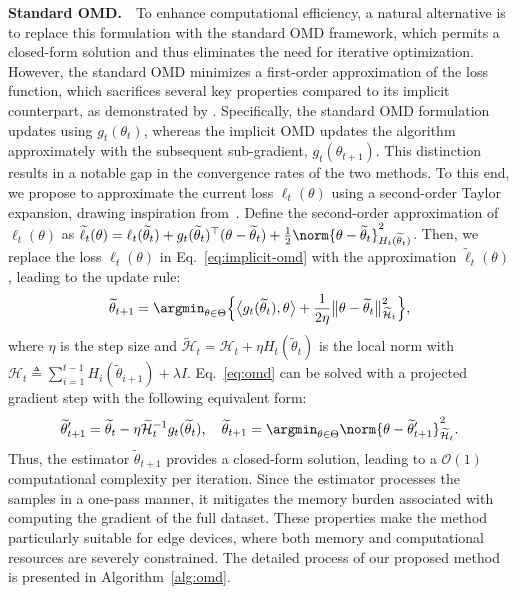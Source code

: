 \textbf{Standard OMD.}~~To enhance computational efficiency, a natural alternative is to replace this formulation with the standard OMD framework, which permits a closed-form solution and thus eliminates the need for iterative optimization. However, the standard OMD minimizes a first-order approximation of the loss function, which sacrifices several key properties compared to its implicit counterpart, as demonstrated by \citet{NeurIPS'20:Campolongo-IOMD}. Specifically, the standard OMD formulation updates using $g_t(\theta_t)$, whereas the implicit OMD updates the algorithm approximately with the subsequent sub-gradient, $g_t(\theta_{t+1})$. This distinction results in a notable gap in the convergence rates of the two methods. To this end, we propose to approximate the current loss $\ell_t(\theta)$ using a second-order Taylor expansion, drawing inspiration from~\citet{NeurIPS'23:MLogB}. Define the second-order approximation of $\ell_t(\theta)$ as $\widetilde{\ell}_t(\theta) = \ell_t(\widetilde{\theta}_t) + g_t(\widetilde{\theta}_t)^\top (\theta - \widetilde{\theta}_t) + \frac{1}{2} \norm{\theta - \widetilde{\theta}_t}_{H_t(\widetilde{\theta}_t)}^2$. Then, we replace the loss $\ell_t(\theta)$ in Eq.~\eqref{eq:implicit-omd} with the approximation $\widetilde{\ell}_t(\theta)$, leading to the update rule:
\begin{align}
  \label{eq:omd}
  \widetilde{\theta}_{t+1}=\argmin_{\theta \in \Theta} \Big\{\big\langle g_t(\widetilde{\theta}_t), \theta \big\rangle +\frac{1}{2 \eta}\big\|\theta-\widetilde{\theta}_t\big\|_{\widetilde{\mathcal{H}}_t}^2\Big\},
\end{align}
where $\eta$ is the step size and $\widetilde{\mathcal{H}}_t = \mathcal{H}_t + \eta H_t(\widetilde{\theta}_t)$ is the local norm with $\mathcal{H}_t \triangleq \sum_{i=1}^{t-1} H_i(\widetilde{\theta}_{i+1}) + \lambda I$. Eq.~\eqref{eq:omd} can be solved with a projected gradient step with the following equivalent form:
\begin{align*}
  \widetilde{\theta}_{t+1}^{\prime} = \widetilde{\theta}_t - \eta \widetilde{\mathcal{H}}_t^{-1} g_t(\widetilde{\theta}_t), ~~~ \widetilde{\theta}_{t+1} = \argmin_{\theta \in \Theta} \norm{\theta - \widetilde{\theta}_{t+1}^{\prime}}_{\widetilde{\mathcal{H}}_t}^2.
\end{align*}
Thus, the estimator $\widetilde{\theta}_{t+1}$ provides a closed-form solution, leading to a $\mathcal{O}(1)$ computational complexity per iteration. Since the estimator processes the samples in a one-pass manner, it mitigates the memory burden associated with computing the gradient of the full dataset. These properties make the method particularly suitable for edge devices, where both memory and computational resources are severely constrained. The detailed process of our proposed method is presented in Algorithm~\ref{alg:omd}.

